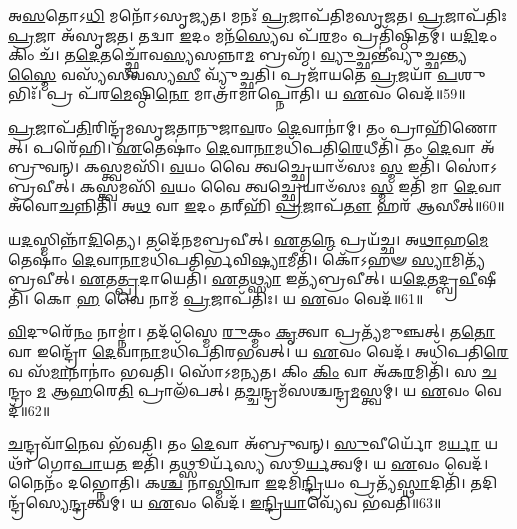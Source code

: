 𑌅\-\ul{𑌸}\-𑌤𑍋𑌽\-\ul{𑌧𑌿} 𑌮𑌨𑍋᳴\-𑌽𑌸𑍃𑌜𑍍𑌯𑌤।
𑌮𑌨𑌃᳴ \ul{𑌪𑍍𑌰}\-𑌜𑌾𑌪᳴𑌤𑌿𑌮\-𑌸𑍃𑌜𑌤।
\-\ul{𑌪𑍍𑌰}\-𑌜𑌾\-𑌪᳴𑌤𑌿𑌃 \ul{𑌪𑍍𑌰}\-𑌜𑌾 𑌅᳴\-𑌸𑍃𑌜𑌤।
𑌤𑌦𑍍𑌵𑌾 \ul{𑌇}\-𑌦𑌂 𑌮𑌨᳴\-\ul{𑌸𑍍𑌯𑍇}\-𑌵 𑌪᳴\-\ul{𑌰}\-𑌮𑌂 𑌪𑍍𑌰𑌤𑌿᳴\-𑌷𑍍𑌠𑌿𑌤𑌮𑍍।
𑌯\-\ul{𑌦𑌿}\-𑌦𑌂 𑌕𑌿𑌂 𑌚᳴।
𑌤\-\ul{𑌦𑍇}\-𑌤𑌚𑍍𑌛𑍍𑌵𑍋᳴𑌵\-\ul{𑌸𑍍𑌯}\-𑌸𑌨𑍍𑌨𑌾\-\ul{𑌮} 𑌬𑍍𑌰𑌹𑍍𑌮᳴।
\-\ul{𑌵𑍍𑌯𑍁}\-𑌚𑍍𑌛𑌨𑍍𑌤𑍀॑𑌵𑍍𑌯𑍁𑌚𑍍𑌛𑌨𑍍𑌤𑍍𑌯\-\ul{𑌸𑍍𑌮𑍈} 𑌵𑌸𑍍𑌯᳴𑌸𑍀𑌵𑌸𑍍𑌯\-\ul{𑌸𑍀} 𑌵𑍍𑌯𑍁᳴𑌚𑍍𑌛𑌤𑌿।
𑌪𑍍𑌰𑌜𑌾᳴𑌯𑌤𑍇 \ul{𑌪𑍍𑌰}\-𑌜𑌯𑌾᳴ \ul{𑌪}\-𑌶𑍁𑌭𑌿𑌃᳴।
𑌪𑍍𑌰 𑌪᳴𑌰\-\ul{𑌮𑍇}\-𑌷𑍍𑌠𑌿\-\ul{𑌨𑍋} 𑌮𑌾𑌤𑍍𑌰𑌾᳴𑌮𑌾𑌪𑍍𑌨𑍋𑌤𑌿।
𑌯 \ul{𑌏}\-𑌵𑌂 𑌵𑍇𑌦᳴॥59॥

\-\ul{𑌪𑍍𑌰}\-𑌜𑌾𑌪᳴\-\ul{𑌤𑌿}\-𑌰𑌿𑌨𑍍𑌦𑍍𑌰᳴𑌮\-𑌸𑍃𑌜𑌤𑌾𑌨𑍁𑌜𑌾\-\ul{𑌵}\-𑌰𑌂 \ul{𑌦𑍇}\-𑌵𑌾𑌨𑌾॑𑌮𑍍।
𑌤𑌂 𑌪𑍍𑌰𑌾𑌹𑌿᳴𑌣𑍋𑌤𑍍।
𑌪𑌰𑍇᳴𑌹𑌿।
\-\ul{𑌏}\-𑌤𑍇𑌷𑌾𑌂॑ \ul{𑌦𑍇}\-𑌵𑌾\-\ul{𑌨𑌾}\-𑌮𑌧𑌿᳴𑌪𑌤𑌿\-\ul{𑌰𑍇}\-𑌧𑍀𑌤𑌿᳴।
𑌤𑌂 \ul{𑌦𑍇}\-𑌵𑌾 𑌅᳴𑌬𑍍𑌰𑍁𑌵𑌨𑍍।
𑌕𑌸𑍍𑌤𑍍𑌵𑌮𑌸𑌿᳴।
\-\ul{𑌵}\-𑌯𑌂 𑌵𑍈 𑌤𑍍𑌵𑌚𑍍𑌛𑍍𑌰𑍇𑌯𑌾𑍞᳴𑌸𑌃 \ul{𑌸𑍍𑌮} 𑌇𑌤𑌿᳴।
𑌸𑍋॑𑌽𑌬𑍍𑌰𑌵𑍀𑌤𑍍।
𑌕𑌸𑍍𑌤𑍍𑌵𑌮𑌸𑌿᳴ \ul{𑌵}\-𑌯𑌂 𑌵𑍈 𑌤𑍍𑌵𑌚𑍍𑌛𑍍𑌰𑍇𑌯𑌾𑍞᳴𑌸𑌃 \ul{𑌸𑍍𑌮} 𑌇𑌤𑌿᳴ 𑌮𑌾 \ul{𑌦𑍇}\-𑌵𑌾 𑌅᳴𑌵𑍋\-\ul{𑌚}\-𑌨𑍍𑌨𑌿𑌤𑌿᳴।
𑌅\-\ul{𑌥} 𑌵𑌾 \ul{𑌇}\-𑌦𑌂 𑌤𑌰𑍍‌\mbox{}𑌹𑌿᳴ \ul{𑌪𑍍𑌰}\-𑌜𑌾𑌪᳴\-\ul{𑌤𑍗} 𑌹𑌰᳴ 𑌆𑌸𑍀𑌤𑍍॥60॥

𑌯\-\ul{𑌦}\-𑌸𑍍𑌮𑌿𑌨𑍍𑌨𑌾᳴\-\ul{𑌦𑌿}\-𑌤𑍍𑌯𑍇।
𑌤𑌦𑍇᳴𑌨𑌮𑌬𑍍𑌰𑌵𑍀𑌤𑍍।
\-\ul{𑌏}\-𑌤\-\ul{𑌨𑍍𑌮𑍇} 𑌪𑍍𑌰𑌯᳴𑌚𑍍𑌛।
𑌅\-\ul{𑌥𑌾}\-𑌹\-\ul{𑌮𑍇}\-𑌤𑍇𑌷𑌾𑌂॑ \ul{𑌦𑍇}\-𑌵𑌾\-\ul{𑌨𑌾}\-𑌮𑌧𑌿᳴𑌪𑌤𑌿𑌰𑍍𑌭𑌵𑌿\-\ul{𑌷𑍍𑌯𑌾}\-𑌮𑍀𑌤𑌿᳴।
𑌕𑍋᳴𑌽𑌹𑍟 \ul{𑌸𑍍𑌯𑌾}\-𑌮𑌿𑌤𑍍𑌯᳴𑌬𑍍𑌰𑌵𑍀𑌤𑍍।
\-\ul{𑌏}\-𑌤\-\ul{𑌤𑍍𑌪𑍍𑌰}\-𑌦𑌾𑌯𑍇𑌤𑌿᳴।
\-\ul{𑌏}\-𑌤\-\ul{𑌥𑍍𑌸𑍍𑌯𑌾} 𑌇𑌤𑍍𑌯᳴𑌬𑍍𑌰𑌵𑍀𑌤𑍍।
𑌯\-\ul{𑌦𑍇}\-𑌤𑌦𑍍𑌬𑍍𑌰\-\ul{𑌵𑍀}\-𑌷𑍀𑌤𑌿᳴।
𑌕𑍋 \ul{𑌹} 𑌵𑍈 𑌨𑌾𑌮᳴ \ul{𑌪𑍍𑌰}\-𑌜𑌾\-𑌪᳴𑌤𑌿𑌃।
𑌯 \ul{𑌏}\-𑌵𑌂 𑌵𑍇𑌦᳴॥61॥

\-\ul{𑌵𑌿}\-𑌦𑍁𑌰𑍇᳴\-\ul{𑌨𑌂} 𑌨𑌾𑌮𑍍𑌨𑌾॑।
𑌤𑌦᳴𑌸𑍍𑌮𑍈 \ul{𑌰𑍁}\-𑌕𑍍𑌮𑌂 \ul{𑌕𑍃}\-𑌤𑍍𑌵𑌾 𑌪𑍍𑌰𑌤𑍍𑌯᳴𑌮𑍁𑌞𑍍𑌚𑌤𑍍।
𑌤\-\ul{𑌤𑍋} 𑌵𑌾 𑌇𑌨𑍍𑌦𑍍𑌰𑍋᳴ \ul{𑌦𑍇}\-𑌵𑌾\-\ul{𑌨𑌾}\-𑌮𑌧𑌿᳴𑌪𑌤𑌿𑌰𑌭𑌵𑌤𑍍।
𑌯 \ul{𑌏}\-𑌵𑌂 𑌵𑍇𑌦᳴।
𑌅𑌧𑌿᳴𑌪𑌤𑌿\-\ul{𑌰𑍇}\-𑌵 𑌸᳴\-\ul{𑌮𑌾}\-𑌨𑌾𑌨𑌾𑌂॑ 𑌭𑌵𑌤𑌿।
𑌸𑍋᳴𑌽𑌮𑌨𑍍𑌯𑌤।
𑌕𑌿𑌂 \ul{𑌕𑌿𑌂} 𑌵𑌾 𑌅᳴𑌕\-\ul{𑌰}\-𑌮𑌿𑌤𑌿᳴।
𑌸 \ul{𑌚}\-𑌨𑍍𑌦𑍍𑌰𑌂 \ul{𑌮} 𑌆\-\ul{𑌹}\-𑌰𑍇\-\ul{𑌤𑌿} 𑌪𑍍𑌰𑌾𑌲᳴𑌪𑌤𑍍।
𑌤\-\ul{𑌚𑍍𑌚}\-𑌨𑍍𑌦𑍍𑌰𑌮᳴𑌸𑌶𑍍𑌚𑌨𑍍𑌦𑍍𑌰\-\ul{𑌮}\-𑌸𑍍𑌤𑍍𑌵𑌮𑍍।
𑌯 \ul{𑌏}\-𑌵𑌂 𑌵𑍇𑌦᳴॥62॥

\-\ul{𑌚}\-𑌨𑍍𑌦𑍍𑌰𑌵𑌾᳴\-\ul{𑌨𑍇}\-𑌵 𑌭᳴𑌵𑌤𑌿।
𑌤𑌂 \ul{𑌦𑍇}\-𑌵𑌾 𑌅᳴𑌬𑍍𑌰𑍁𑌵𑌨𑍍।
\-\ul{𑌸𑍁}\-𑌵𑍀𑌰𑍍𑌯𑍋᳴ 𑌮\-\ul{𑌰𑍍𑌯𑌾} 𑌯𑌥𑌾᳴ 𑌗𑍋\-\ul{𑌪𑌾}\-𑌯\-\ul{𑌤} 𑌇𑌤𑌿᳴।
𑌤𑌥𑍍𑌸𑍂𑌰𑍍𑌯᳴𑌸𑍍𑌯 𑌸𑍂\-\ul{𑌰𑍍𑌯}\-𑌤𑍍𑌵𑌮𑍍।
𑌯 \ul{𑌏}\-𑌵𑌂 𑌵𑍇𑌦᳴।
𑌨𑍈𑌨𑌂᳴ 𑌦𑌭𑍍𑌨𑍋𑌤𑌿।
𑌕\-\ul{𑌶𑍍𑌚} 𑌨𑌾\-\ul{𑌸𑍍𑌮𑌿}\-𑌨𑍍𑌵𑌾 \ul{𑌇}\-𑌦𑌮𑌿᳴\-\ul{𑌨𑍍𑌦𑍍𑌰𑌿}\-𑌯𑌂 𑌪𑍍𑌰𑌤𑍍𑌯᳴\-\ul{𑌸𑍍𑌥𑌾}\-𑌦𑌿𑌤𑌿᳴।
𑌤𑌦𑌿𑌨𑍍𑌦𑍍𑌰᳴𑌸𑍍𑌯𑍇\-\ul{𑌨𑍍𑌦𑍍𑌰}\-𑌤𑍍𑌵𑌮𑍍।
𑌯 \ul{𑌏}\-𑌵𑌂 𑌵𑍇𑌦᳴।
\-\ul{𑌇}\-\-\ul{𑌨𑍍𑌦𑍍𑌰𑌿}\-\-\ul{𑌯𑌾}\-𑌵𑍍𑌯𑍇᳴𑌵 𑌭᳴𑌵𑌤𑌿॥63॥

